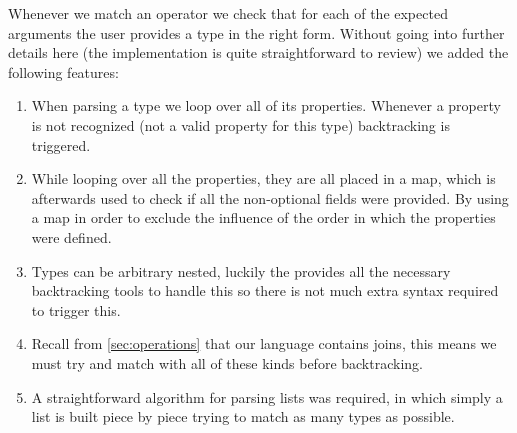 \par
Whenever we match an operator we check that for each of the expected arguments
the user provides a type in the right form. Without going into further details
here (the implementation is quite straightforward to review) we added the
following features:

\begin{enumerate}
  \item When parsing a type we loop over all of its properties. Whenever a
  property is not recognized (not a valid property for this type) backtracking
  is triggered.
  \item While looping over all the properties, they are all placed in a map,
  which is afterwards used to check if all the non-optional fields were
  provided. By using a map in order to exclude the influence of the order in
  which the properties were defined.
  \item Types can be arbitrary nested, luckily the 
  provides all the necessary backtracking tools to handle this so there is not
  much extra syntax required to trigger this.
  \item Recall from \ref{sec:operations} that our language contains joins, this
  means we must try and match with all of these kinds before backtracking.
  \item A straightforward algorithm for parsing lists was required, in which 
  simply a list is built piece by piece trying to match as many types as
  possible.
\end{enumerate}